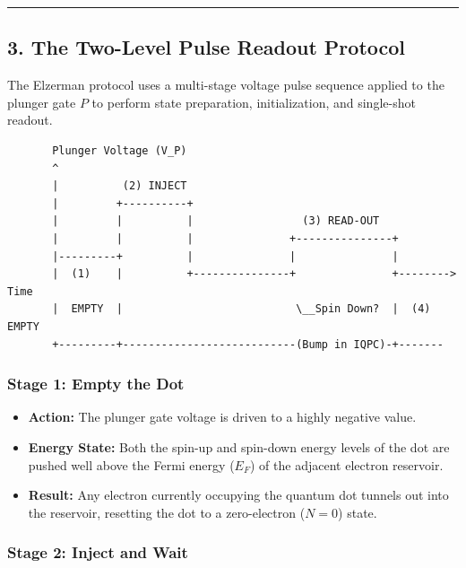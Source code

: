 \documentclass[
]{article}
\providecommand{\tightlist}{%
  \setlength{\itemsep}{0pt}\setlength{\parskip}{0pt}}
\begin{document}
\begin{center}\rule{0.5\linewidth}{0.5pt}\end{center}

\subsection{3. The Two-Level Pulse Readout
Protocol}\label{the-two-level-pulse-readout-protocol}

The Elzerman protocol uses a multi-stage voltage pulse sequence applied
to the plunger gate \(P\) to perform state preparation, initialization,
and single-shot readout.

\begin{verbatim}
       Plunger Voltage (V_P)
       ^
       |          (2) INJECT
       |         +----------+
       |         |          |                 (3) READ-OUT
       |         |          |               +---------------+
       |---------+          |               |               |
       |  (1)    |          +---------------+               +--------> Time
       |  EMPTY  |                           \__Spin Down?  |  (4) EMPTY
       +---------+---------------------------(Bump in IQPC)-+-------
\end{verbatim}

\subsubsection{Stage 1: Empty the Dot}\label{stage-1-empty-the-dot}

\begin{itemize}
\tightlist
\item
  \textbf{Action:} The plunger gate voltage is driven to a highly
  negative value.
\item
  \textbf{Energy State:} Both the spin-up and spin-down energy levels of
  the dot are pushed well above the Fermi energy (\(E_F\)) of the
  adjacent electron reservoir.
\item
  \textbf{Result:} Any electron currently occupying the quantum dot
  tunnels out into the reservoir, resetting the dot to a zero-electron
  (\(N=0\)) state.
\end{itemize}

\subsubsection{Stage 2: Inject and Wait}\label{stage-2-inject-and-wait}
\end{document}
